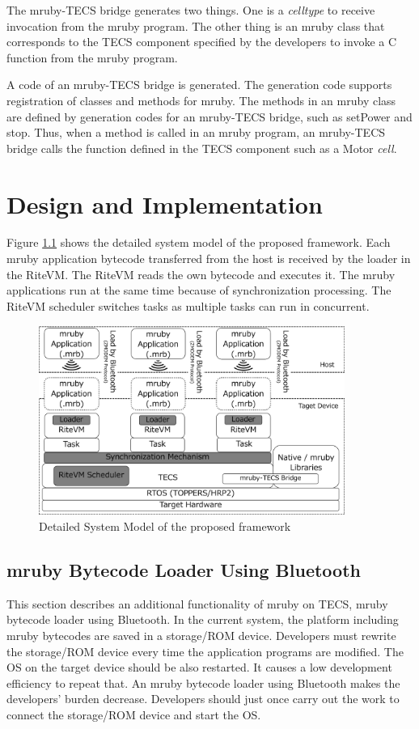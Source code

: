 \documentclass[a4j,12pt,oneside,openany,english]{jsbook}
\begin{document}
The mruby-TECS bridge generates two things.
One is a {\it celltype} to receive invocation from the mruby program.
The other thing is an mruby class that corresponds to the TECS component specified by the developers to invoke a C function from the mruby program.

A code of an mruby-TECS bridge is generated.
The generation code supports registration of classes and methods for mruby.
The methods in an mruby class are defined by generation codes for an mruby-TECS bridge, such as setPower and stop.
Thus, when a method is called in an mruby program, an mruby-TECS bridge calls the function defined in the TECS component such as a Motor {\it cell}.

\chapter{Design and Implementation}
\label{sec:Design and Implementation}
Figure \ref{fig:system_model} shows the detailed system model of the proposed framework.
Each mruby application bytecode transferred from the host is received by the loader in the RiteVM.
The RiteVM reads the own bytecode and executes it.
The mruby applications run at the same time because of synchronization processing.
The RiteVM scheduler switches tasks as multiple tasks can run in concurrent.

\begin{figure}[t]
    \centering
    \includegraphics[width=10cm,clip]{../EMSOFT2016/figure/system_model.pdf}
    \caption{Detailed System Model of the proposed framework}
    \label{fig:system_model}
\end{figure}

\section{mruby Bytecode Loader Using Bluetooth}
\label{sec:mruby bytecode loader using Bluetooth}
This section describes an additional functionality of mruby on TECS, mruby bytecode loader using Bluetooth.
In the current system, the platform including mruby bytecodes are saved in a storage/ROM device.
Developers must rewrite the storage/ROM device every time the application programs are modified.
The OS on the target device should be also restarted.
It causes a low development efficiency to repeat that.
An mruby bytecode loader using Bluetooth makes the developers' burden decrease.
Developers should just once carry out the work to connect the storage/ROM device and start the OS. 
\end{document}
